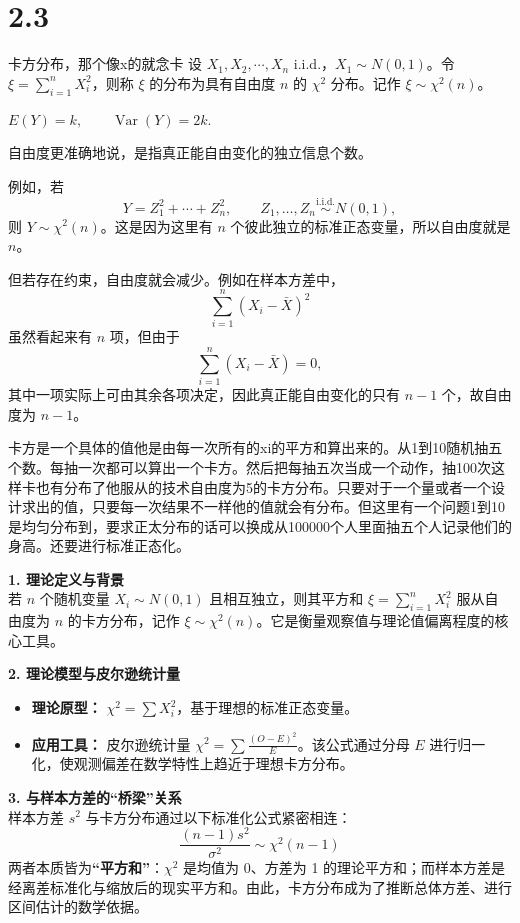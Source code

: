\section*{2.3}
\begin{definition}{卡方分布，那个像x的就念卡}
设 $X_1, X_2, \cdots, X_n$ i.i.d.，$X_1 \sim N(0,1)$。令 $\xi = \sum_{i=1}^{n} X_i^2$，则称 $\xi$ 的分布为具有自由度 $n$ 的 $\chi^2$ 分布。记作 $\xi \sim \chi^2(n)$。
\end{definition}
\begin{dxtips}[卡方分布要记的公式]
    $E(Y)=k,\qquad \operatorname{Var}(Y)=2k.$
\end{dxtips}
\begin{note}
自由度更准确地说，是指真正能自由变化的独立信息个数。

例如，若
\[
Y=Z_1^2+\cdots+Z_n^2,\qquad Z_1,\dots,Z_n \stackrel{\text{i.i.d.}}{\sim} N(0,1),
\]
则 \(Y\sim \chi^2(n)\)。这是因为这里有 \(n\) 个彼此独立的标准正态变量，所以自由度就是 \(n\)。

但若存在约束，自由度就会减少。例如在样本方差中，
\[
\sum_{i=1}^n (X_i-\bar X)^2
\]
虽然看起来有 \(n\) 项，但由于
\[
\sum_{i=1}^n (X_i-\bar X)=0,
\]
其中一项实际上可由其余各项决定，因此真正能自由变化的只有 \(n-1\) 个，故自由度为 \(n-1\)。
\end{note}
\begin{dxtips}
    卡方是一个具体的值他是由每一次所有的xi的平方和算出来的。从1到10随机抽五个数。每抽一次都可以算出一个卡方。然后把每抽五次当成一个动作，抽100次这样卡也有分布了他服从的技术自由度为5的卡方分布。只要对于一个量或者一个设计求出的值，只要每一次结果不一样他的值就会有分布。但这里有一个问题1到10是均匀分布到，要求正太分布的话可以换成从100000个人里面抽五个人记录他们的身高。还要进行标准正态化。
\end{dxtips}
\begin{note}
\textbf{1. 理论定义与背景} \\
若 $n$ 个随机变量 $X_i \sim N(0,1)$ 且相互独立，则其平方和 $\xi = \sum_{i=1}^{n} X_{i}^{2}$ 服从自由度为 $n$ 的卡方分布，记作 $\xi \sim \chi^{2}(n)$。它是衡量观察值与理论值偏离程度的核心工具。

\textbf{2. 理论模型与皮尔逊统计量} \\
\begin{itemize}
    \item \textbf{理论原型：} $\chi^{2} = \sum X_{i}^{2}$，基于理想的标准正态变量。
    \item \textbf{应用工具：} 皮尔逊统计量 $\chi^{2} = \sum \frac{(O-E)^{2}}{E}$。该公式通过分母 $E$ 进行归一化，使观测偏差在数学特性上趋近于理想卡方分布。
\end{itemize}

\textbf{3. 与样本方差的“桥梁”关系} \\
样本方差 $s^{2}$ 与卡方分布通过以下标准化公式紧密相连：
$$\frac{(n-1)s^{2}}{\sigma^{2}} \sim \chi^{2}(n-1)$$
两者本质皆为\textbf{“平方和”}：$\chi^{2}$ 是均值为 0、方差为 1 的理论平方和；而样本方差是经离差标准化与缩放后的现实平方和。由此，卡方分布成为了推断总体方差、进行区间估计的数学依据。
\end{note}
